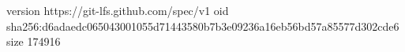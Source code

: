 version https://git-lfs.github.com/spec/v1
oid sha256:d6adaedc065043001055d71443580b7b3e09236a16eb56bd57a85577d302cde6
size 174916
